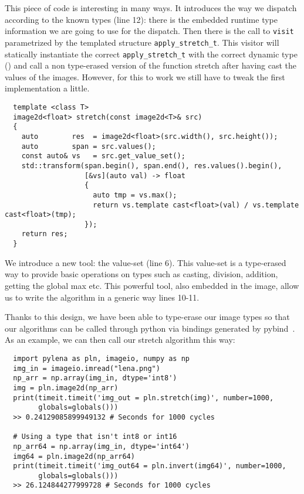 This piece of code is interesting in many ways. It introduces the way we dispatch according to the known types (line
12): there is the embedded runtime type information we are going to use for the dispatch. Then there is the call to
\texttt{visit} parametrized by the templated structure \texttt{apply\_stretch\_t}. This visitor will statically
instantiate the correct \texttt{apply\_stretch\_t} with the correct dynamic type () and call a
non type-erased version of the function stretch after having cast the values of the images. However, for this to work we
still have to tweak the first implementation a little.

\begin{verbatim}
  template <class T>
  image2d<float> stretch(const image2d<T>& src)
  {
    auto        res  = image2d<float>(src.width(), src.height());
    auto        span = src.values();
    const auto& vs   = src.get_value_set();
    std::transform(span.begin(), span.end(), res.values().begin(),
                   [&vs](auto val) -> float
                   {
                     auto tmp = vs.max();
                     return vs.template cast<float>(val) / vs.template cast<float>(tmp);
                   });
    return res;
  }
\end{verbatim}

We introduce a new tool: the value-set (line 6). This value-set is a type-erased way to provide basic operations on
types such as casting, division, addition, getting the global max etc. This powerful tool, also embedded in the image,
allow us to write the algorithm in a generic way lines 10-11.

Thanks to this design, we have been able to type-erase our image types so that our algorithms can be called through
python via bindings generated by pybind~\cite{jakob.2017.pybind11}. As an example, we can then call our stretch
algorithm this way:

\begin{verbatim}
  import pylena as pln, imageio, numpy as np
  img_in = imageio.imread("lena.png")
  np_arr = np.array(img_in, dtype='int8')
  img = pln.image2d(np_arr)
  print(timeit.timeit('img_out = pln.stretch(img)', number=1000,
        globals=globals()))
  >> 0.24129085899949132 # Seconds for 1000 cycles

  # Using a type that isn't int8 or int16
  np_arr64 = np.array(img_in, dtype='int64')
  img64 = pln.image2d(np_arr64)
  print(timeit.timeit('img_out64 = pln.invert(img64)', number=1000,
        globals=globals()))
  >> 26.124844277999728 # Seconds for 1000 cycles
\end{verbatim}

